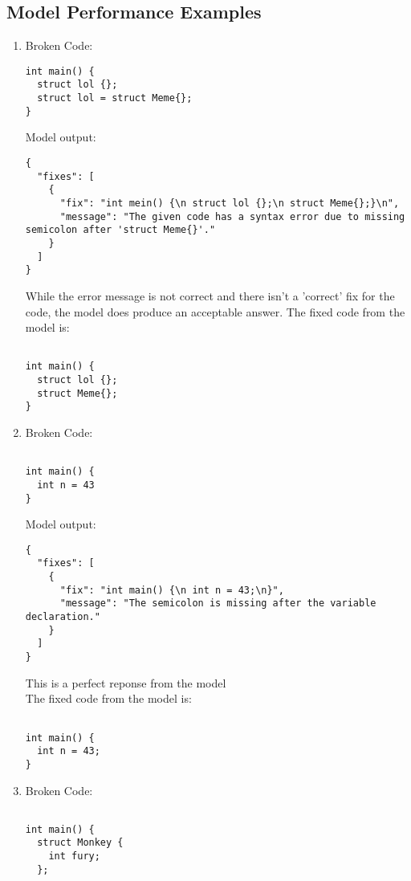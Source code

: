 \documentclass{article}
\begin{document}
	\subsection{Model Performance Examples}
		\begin{enumerate}
			\item
			Broken Code:
			\begin{verbatim}
int main() {
  struct lol {};
  struct lol = struct Meme{};
}
			\end{verbatim}
			Model output:
			\begin{verbatim}
{
  "fixes": [
    {
      "fix": "int mein() {\n struct lol {};\n struct Meme{};}\n",
      "message": "The given code has a syntax error due to missing semicolon after 'struct Meme{}'."
    }
  ]
}
			\end{verbatim}
			While the error message is not correct and there isn't a 'correct' fix for the code, the model does produce an acceptable answer.
			The fixed code from the model is:
			\begin{verbatim}

int main() {
  struct lol {};
  struct Meme{};
}
			\end{verbatim}


			\item
			Broken Code:
			\begin{verbatim}

int main() {
  int n = 43
}
			\end{verbatim}
			Model output:
			\begin{verbatim}
{
  "fixes": [
    {
      "fix": "int main() {\n int n = 43;\n}",
      "message": "The semicolon is missing after the variable declaration."
    }
  ]
}			\end{verbatim}
			This is a perfect reponse from the model \\
			The fixed code from the model is:
			\begin{verbatim}

int main() {
  int n = 43;
}
			\end{verbatim}

			\item
			Broken Code:
			\begin{verbatim}

int main() {
  struct Monkey {
    int fury;
  };


\end{verbatim}
\end{enumerate}
\end{document}
